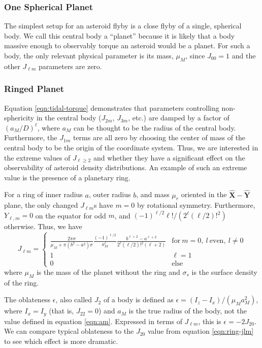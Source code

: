 \documentclass{aastex631}
\newcommand{\unit}[1]{\hat{\bm{#1}}}
\begin{document}
\subsubsection{One Spherical Planet}
The simplest setup for an asteroid flyby is a close flyby of a single, spherical body. We call this central body a ``planet'' because it is likely that a body massive enough to observably torque an asteroid would be a planet. For such a body, the only relevant physical parameter is its mass, $\mu_M$, since $J_{00} = 1$ and the other $J_{\ell m}$ parameters are zero.

\subsubsection{Ringed Planet}
Equation \ref{eqn:tidal-torque} demonstrates that parameters controlling non-sphericity in the central body ($J_{2m}$, $J_{3m}$, etc.) are damped by a factor of $(a_M/D)^\ell$, where $a_M$ can be thought to be the radius of the central body. Furthermore, the $J_{1m}$ terms are all zero by choosing the center of mass of the central body to be the origin of the coordinate system. Thus, we are interested in the extreme values of $J_{\ell \geq 2}$ and whether they have a significant effect on the observability of asteroid density distributions. An example of such an extreme value is the presence of a planetary ring.

For a ring of inner radius $a$, outer radius $b$, and mass $\mu_r$ oriented in the $\unit X-\unit Y$ plane, the only changed $J_{\ell m}$s have $m = 0$ by rotational symmetry. Furthermore, $Y_{\ell, m} = 0$ on the equator for odd $m$, and $(-1)^{\ell/2} \ell! / (2^\ell (\ell/2)!^2)$ otherwise. Thus, we have
\begin{equation}
J_{\ell m} = \left\{\begin{array}{cc}
\frac{2 \pi \sigma}{\mu_M + \pi(b^2-a^2)\sigma}\frac{(-1)^{\ell/2}}{a_M^\ell}\frac{b^{\ell+2} - a^{\ell+2}}{2^\ell (\ell/2)!^2 (\ell + 2)}
 & \text{for}\ m = 0,\ l\ \text{even},\ l \neq 0\\
1 & \ell = 1\\
0 & \text{else}
\end{array}\right.
\label{eqn:ring-jlm}
\end{equation}
where $\mu_M$ is the mass of the planet without the ring and $\sigma_s$ is the surface density of the ring.


The oblateness $\epsilon$, also called $J_2$ of a body is defined as $\epsilon = (I_z - I_x)/(\mu_M a_M^2)$, where $I_x = I_y$ (that is, $J_{22} = 0$) and $a_M$ is the true radius of the body, not the value defined in equation \ref{eqn:am}. Expressed in terms of $J_{\ell m}$, this is $\epsilon = -2J_{20}$. We can compare typical oblateness to the $J_{20}$ value from equation \ref{eqn:ring-jlm} to see which effect is more dramatic.
\end{document}
